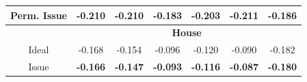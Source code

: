 \message{ !name(sgerrish_prefpo.tex)}\documentclass{beamer}
\begin{document}
{\begin{tabular}{|c|cccccc|}
    \hspace{-5pt} Perm. Issue \hspace{-5pt}
    & \hspace{-4pt} -0.210 \hspace{-5pt}
    & \hspace{-4pt} -0.210 \hspace{-5pt}
    & \hspace{-4pt} -0.183 \hspace{-5pt}
    & \hspace{-4pt} -0.203 \hspace{-5pt}
    & \hspace{-4pt} -0.211 \hspace{-5pt}
    & \hspace{-4pt} -0.186 \hspace{-4pt} \\
    \hline
    \hline
    & \multicolumn{6}{|c|}{\textbf{House}} \\
    \hline
    Ideal & \hspace{-4pt} -0.168 \hspace{-5pt}
    & \hspace{-4pt} -0.154 \hspace{-5pt}
    & \hspace{-4pt} -0.096 \hspace{-5pt}
    & \hspace{-4pt} -0.120 \hspace{-5pt}
    & \hspace{-4pt} -0.090 \hspace{-5pt}
    & \hspace{-4pt} -0.182 \hspace{-4pt} \\
    Issue
    & \hspace{-4pt} \textbf{-0.166} \hspace{-5pt}
    & \hspace{-4pt} \textbf{-0.147} \hspace{-5pt}
    & \hspace{-4pt} \textbf{-0.093} \hspace{-5pt}
    & \hspace{-4pt} \textbf{-0.116} \hspace{-5pt}
    & \hspace{-4pt} \textbf{-0.087} \hspace{-5pt}
    & \hspace{-4pt} \textbf{-0.180} \hspace{-4pt} \\

\end{tabular}}
\end{document}
